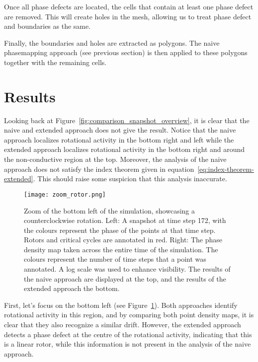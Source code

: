 \documentclass[twocolumn]{article}
\begin{document}
Once all phase defects are located, the cells that contain at least one
phase defect are removed. This will create holes in the mesh, allowing
us to treat phase defect and boundaries as the same.

Finally, the boundaries and holes are extracted as polygons. The naive
phasemapping approach (see previous section) is then applied to these
polygons together with the remaining cells.

\section{Results}\label{results}

Looking back at Figure~\ref{fig:comparison_snapshot_overview}, it is
clear that the naive
and extended approach does not give the result. Notice that the naive
approach localizes rotational activity in the bottom right and left
while the extended approach localizes rotational activity in the bottom
right and around the non-conductive region at the top. Moreover, the
analysis of the naive approach does not satisfy the index theorem given
in equation~\ref{eq:index-theorem-extended}. This should raise some
suspicion that this analysis
inaccurate.

\begin{figure}[ht]
  \centering
  \texttt{[image: zoom\_rotor.png]}
  \caption{Zoom of the bottom left of the simulation, showcasing a
    counterclockwise rotation. Left: A snapshot at time step 172, with the
    colours represent the phase of the points at that time step. Rotors and
    critical cycles are annotated in red. Right: The phase density map taken
    across the entire time of the simulation. The colours represent the
    number of time steps that a point was annotated. A log scale was used to
    enhance visibility. The results of the naive approach are displayed at
  the top, and the results of the extended approach the bottom.}
  \label{fig:zoom-rotor}
\end{figure}

First, let's focus on the bottom left (see Figure~\ref{fig:zoom-rotor}).
Both approaches identify rotational activity in this region, and by
comparing both point density maps, it is clear that they also recognize
a similar drift. However, the extended approach detects a phase defect
at the centre of the rotational activity, indicating that this is a
linear rotor, while this information is not present in the analysis of
the naive approach.
\end{document}
